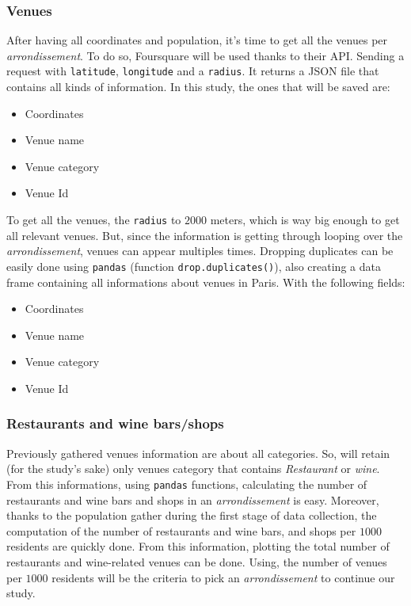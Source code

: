\documentclass[english]{article}
\begin{document}
	\subsubsection{Venues}
	After having all coordinates and population, it's time to get all the venues per \textit{arrondissement}. To do so, Foursquare will be used thanks to their API. Sending a request with \texttt{latitude}, \texttt{longitude} and a \texttt{radius}. It returns a JSON file that contains all kinds of information. In this study, the ones that will be saved are:
	\begin{itemize}
		\item Coordinates
		\item Venue name
		\item Venue category
		\item Venue Id
	\end{itemize}
	To get all the venues, the \texttt{radius} to $2000$ meters, which is way big enough to get all relevant venues. But, since the information is getting through looping over the \textit{arrondissement}, venues can appear multiples times. Dropping duplicates can be easily done using \texttt{pandas} (function \texttt{drop.duplicates()}), also creating a data frame containing all informations about venues in Paris. With the following fields:	
	\begin{itemize}
		\item Coordinates
		\item Venue name
		\item Venue category
		\item Venue Id
	\end{itemize}
	\subsubsection{Restaurants and wine bars/shops}
	Previously gathered venues information are about all categories. So, will retain (for the study's sake) only venues category that contains \textit{Restaurant} or \textit{wine}. From this informations, using \texttt{pandas} functions, calculating the number of restaurants and wine bars and shops in an \textit{arrondissement} is easy. Moreover, thanks to the population gather during the first stage of data collection, the computation of the number of restaurants and wine bars, and shops per $1000$ residents are quickly done. From this information, plotting the total number of restaurants and wine-related venues can be done. Using, the number of venues per $1000$ residents will be the criteria to pick an \textit{arrondissement} to continue our study.
\end{document}
